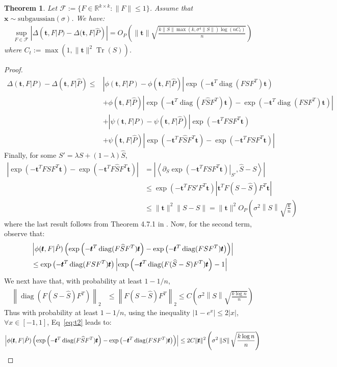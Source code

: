 \documentclass[letterpaper]{article}
\newtheorem{theorem}{Theorem}
\newcommand{\ba}[1]{\begin{align}#1\end{align}}
\newcommand{\bas}[1]{\begin{align*}#1\end{align*}}
\newcommand{\bx}{\pmb{x}}
\newcommand{\bt}{\pmb{t}}
\newcommand{\nt}{\|\bt\|}
\newcommand{\nts}{\|\bt\|^2}
\newcommand{\rd}{\color{red}}
\newcommand{\bk}{\color{black}}
\newcommand{\norm}[1]{\left\|#1\right\|}
\newcommand{\bb}[1]{\left(#1\right)}
\newcommand{\bbb}[1]{\left[#1\right]}
\newcommand{\babs}[1]{\left|#1\right|}
\DeclareMathOperator{\Tr}{Tr}
\DeclareMathOperator{\diag}{diag}
\begin{document}
\begin{theorem}\label{thm:indscore}
    Let $\mathcal{F}:=\{F\in \mathbb{R}^{k\times k}:\|F\|\leq 1\}$. Assume that $\bx\sim\text{subgaussian}(\sigma)$. 
    We have:
    \bas{
    \sup_{F\in\mathcal{F}}|\Delta(\bt,F|P)-\Delta(\bt,F|\hat{P})|=O_P\bb{\nt\sqrt{\frac{k\|S\|\max(k,\sigma^{4}\|S\|)\log (nC_t)}{n}}}
    }
    where $C_{t} := \max(1,
    \nts\Tr(S))$.
\end{theorem}
\begin{proof}
\bas{
\Delta(\bt,F|P)-\Delta(\bt,F|\hat{P})\leq &\babs{\phi(\bt,F|P)-      \phi(\bt,F|\hat{P})}\exp\bb{-\bt^T\diag(FSF^T)\bt}\\
                                    &+\phi(\bt,F|\hat{P})\babs{\exp\bb{-\bt^T\diag(F\widehat{S}F^T)\bt}-\exp\bb{-\bt^T\diag(FSF^T)\bt}}\\
                                    &+\babs{\psi(\bt,F|P)-\psi(\bt,F|\hat{P})}\exp\bb{-\bt^TFSF^T\bt}\\
                                    &+\psi(\bt,F|\hat{P})\babs{\exp\bb{-\bt^TF\widehat{S}F^T\bt}-\exp\bb{-\bt^TFSF^T\bt}}
}
Finally, for some $S'=\lambda S+(1-\lambda)\hat{S}$,  %
\bas{
|\exp(-\bt^T FSF^T\bt)-\exp(-\bt^T F\hat{S}F^T\bt)|&=\left|\left\langle\left.\partial_{S}\exp(-\bt^T FSF^T\bt)\right|_{S'},\hat{S}-S\right\rangle\right|\\
&\leq \exp(-\bt^T FS'F^T\bt)\left|\bt^TF(S-\hat{S})F^T\bt\right| \\
&\leq \|\bt\|^2\|S-\hat{S}\|= \|\bt\|^2 O_P\bb{ \sigma^{2}\norm{S}\sqrt{\frac{k}{n}}}
}
where the last result follows from Theorem 4.7.1 in \cite{vershynin2018high}. Now, for the second term, observe that:
\ba{
&\left|\phi(\bt,F|\hat{P})\bb{\exp\bb{-\bt^T\diag(F\widehat{S}F^T)\bt}-\exp\bb{-\bt^T\diag(FSF^T)\bt}}\right|\notag\\
&\leq \exp\bb{-\bt^T\diag(FSF^T)\bt}\left|\exp\bb{-\bt^T\diag(F(\widehat{S}-S)F^T)\bt}-1\right|\label{eq:t2}
}
We next have that, with probability at least $1-1/n$,
\bas{   
    \left\|\diag\bb{F (S-\widehat{S}) F^T}\right\|_{2} 
    &\leq \left\| F (S-\widehat{S}) F^T \right\|_{2} 
    \leq C\bb{ \sigma^{2}\norm{S}\sqrt{\frac{k\log n}{n}}}
}
Thus with probability at least $1-1/n$, using the inequality $|1-e^{x}| \leq 2|x|$, $\forall x \in \bbb{-1,1}$, Eq~\ref{eq:t2} leads to:
\bas{
\left|\phi(\bt,F|\hat{P})\bb{\exp\bb{-\bt^T\diag(F\widehat{S}F^T)\bt}-\exp\bb{-\bt^T\diag(FSF^T)\bt}}\right|
\leq 2C\|\bt\|^2\bk\bb{\sigma^{2}\norm{S}\sqrt{\frac{k\log n}{n}}}
}


\end{proof}
\end{document}
